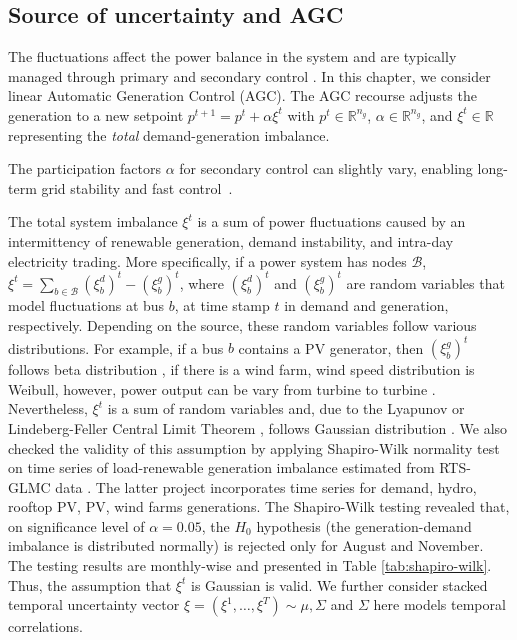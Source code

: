\subsection{Source of uncertainty and AGC}
\label{sec:fluctuations}
\vspace{-2mm}

The fluctuations affect the power balance in the system and are typically managed through primary and secondary control \cite{machowski2020power}. In this chapter, we consider linear Automatic Generation Control (AGC). The AGC recourse adjusts the generation to a new setpoint $p^{t+1} = p^t + \alpha \xi^t$ \cite{roald2017chance,baros2021examining,mezghani2020stochastic} with $p^t \in \mathbb{R}^{n_g}$, $\alpha \in \mathbb{R}^{n_g}$, and $\xi^t \in \mathbb{R}$ representing the \emph{total} demand-generation imbalance.

The participation factors $\alpha$ for secondary control can slightly vary, enabling long-term grid stability and fast control~\cite{machowski2020power}. 


The total system imbalance $\xi^{t}$ is a sum of power fluctuations caused by an intermittency of renewable generation, demand instability, and intra-day electricity trading. More specifically, if a power system has nodes $\mathcal{B}$, $\xi^t = \sum_{b \in \mathcal{B}} (\xi_b^d)^t - (\xi_b^g)^t$, where $(\xi_b^d)^t$ and $(\xi_b^g)^t$ are random variables that model fluctuations at bus $b$, at time stamp $t$ in demand and generation, respectively. Depending on the source, these random variables follow various distributions. For example, if a bus $b$ contains a PV generator, then $(\xi_b^g)^t$ follows beta distribution \cite{wang2010probabilistic}, if there is a wind farm, wind speed distribution is Weibull, however, power output can be vary from turbine to turbine \cite{dhople2012framework}. Nevertheless, $\xi^t$ is a sum of random variables and, due to the Lyapunov or Lindeberg-Feller Central Limit Theorem \cite{scholz2011central}, follows Gaussian distribution \cite{rouaud2013probability, draper2021practical}. We also checked the validity of this assumption by applying Shapiro-Wilk normality test \cite{shapiro1965analysis} on time series of load-renewable generation imbalance estimated from RTS-GLMC data \cite{barrows2019ieee}. The latter project incorporates time series for demand, hydro, rooftop PV, PV, wind farms generations. The Shapiro-Wilk testing revealed that, on significance level of $\alpha=0.05$, the $H_0$ hypothesis (the generation-demand imbalance is distributed normally) is rejected only for August and November. The testing results are monthly-wise and presented in Table \ref{tab:shapiro-wilk}. Thus, the assumption that $\xi^t$ is Gaussian is valid. We further consider stacked temporal uncertainty vector $\xi = (\xi^1, \dots, \xi^T) \sim \mathcal{\mu, \Sigma}$ and $\Sigma$ here models temporal correlations.

